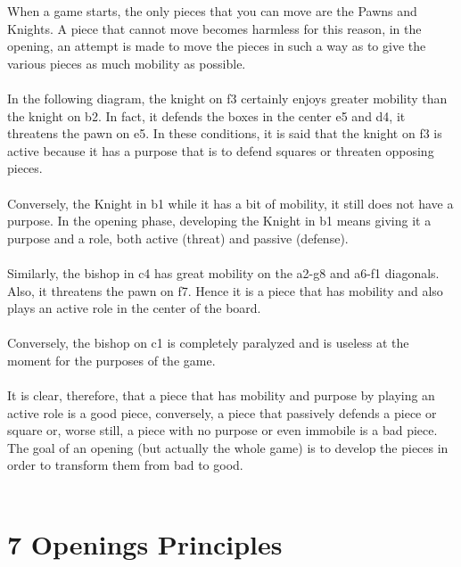 \documentclass{article}
\begin{document}
When a game starts, the only pieces that you can move are the Pawns and Knights. A piece that cannot move becomes harmless for this reason, in the opening, an attempt is made to move the pieces in such a way as to give the various pieces as much mobility as possible.\\\\In the following diagram, the knight on f3 certainly enjoys greater mobility than the knight on b2. In fact, it defends the boxes in the center e5 and d4, it threatens the pawn on e5. In these conditions, it is said that the knight on f3 is active because it has a purpose that is to defend squares or threaten opposing pieces.\\\\Conversely, the Knight in b1 while it has a bit of mobility, it still does not have a purpose. In the opening phase, developing the Knight in b1 means giving it a purpose and a role, both active (threat) and passive (defense).\\\\Similarly, the bishop in c4 has great mobility on the a2-g8 and a6-f1 diagonals. Also, it threatens the pawn on f7. Hence it is a piece that has mobility and also plays an active role in the center of the board.\\\\Conversely, the bishop on c1 is completely paralyzed and is useless at the moment for the purposes of the game.\\\\It is clear, therefore, that a piece that has mobility and purpose by playing an active role is a good piece, conversely, a piece that passively defends a piece or square or, worse still, a piece with no purpose or even immobile is a bad piece. The goal of an opening (but actually the whole game) is to develop the pieces in order to transform them from bad to good.\\
\\
\section{ 7 Openings Principles}
\end{document}

